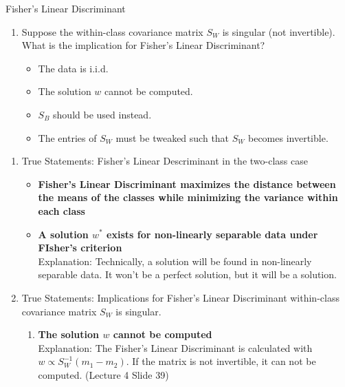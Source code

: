 \documentclass[
	english,
        solution=true
	]{tudaexercise}
\begin{document}
\begin{task}[points=6]{Fisher's Linear Discriminant}
\begin{subtask}[points=3]{}
\begin{enumerate}
\item Suppose the within-class covariance matrix $S_W$ is singular (not invertible). What is the implication for Fisher’s Linear Discriminant?
\begin{itemize}[label=\Square]
    \item The data is i.i.d.
    \item The solution $w$ cannot be computed.
    \item $S_B$ should be used instead.
    \item The entries of $S_W$ must be tweaked such that $S_W$ becomes invertible.
\end{itemize}
\end{enumerate}

\end{subtask}


\begin{solution}

\begin{enumerate}
    \item True Statements: Fisher's Linear Descriminant in the two-class case
    \begin{itemize}
        \item \textbf{Fisher's Linear Discriminant maximizes the distance between the means of the classes while minimizing the variance within each class}
        \item \textbf{A solution $w^*$ exists for non-linearly separable data under FIsher's criterion}\\ Explanation: Technically, a solution will be found in non-linearly separable data. It won't be a perfect solution, but it will be a solution.
    \end{itemize}
    \item True Statements: Implications for Fisher's Linear Discriminant within-class covariance matrix $S_W$ is singular.
    \begin{enumerate}
        \item \textbf{The solution $w$ cannot be computed} \\ 
        Explanation: The Fisher's Linear Discriminant is calculated with $w \propto S^{-1}_W (m_1-m_2)$. If the matrix is not invertible, it can not be computed. (Lecture 4 Slide 39)
    \end{enumerate}
\end{enumerate}

\end{solution}
\end{task}
\end{document}
